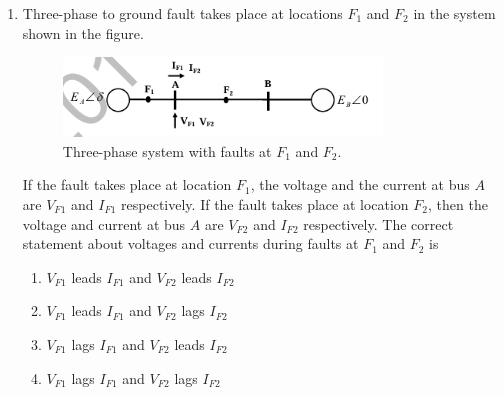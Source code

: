 \documentclass[journal,12pt,onecolumn]{IEEEtran}
\begin{document}
\begin{enumerate}[label=Q\arabic*:, leftmargin=*, itemindent=0pt, start=10]
\item Three-phase to ground fault takes place at locations $F_1$ and $F_2$ in the system shown in the figure.
\begin{figure}[h]
    \centering
    \includegraphics[width=0.8\textwidth]{figs/system_fault.png}
    \caption{Three-phase system with faults at $F_1$ and $F_2$.}
    \label{fig:system_fault}
\end{figure}

If the fault takes place at location $F_1$, the voltage and the current at bus $A$ are $V_{F1}$ and $I_{F1}$ respectively. If the fault takes place at location $F_2$, then the voltage and current at bus $A$ are $V_{F2}$ and $I_{F2}$ respectively. The correct statement about voltages and currents during faults at $F_1$ and $F_2$ is
\begin{enumerate}[label=(\Alph*)]
    \item $V_{F1}$ leads $I_{F1}$ and $V_{F2}$ leads $I_{F2}$
    \item $V_{F1}$ leads $I_{F1}$ and $V_{F2}$ lags $I_{F2}$
    \item $V_{F1}$ lags $I_{F1}$ and $V_{F2}$ leads $I_{F2}$
    \item $V_{F1}$ lags $I_{F1}$ and $V_{F2}$ lags $I_{F2}$
\end{enumerate}

\end{enumerate}

\end{document}
